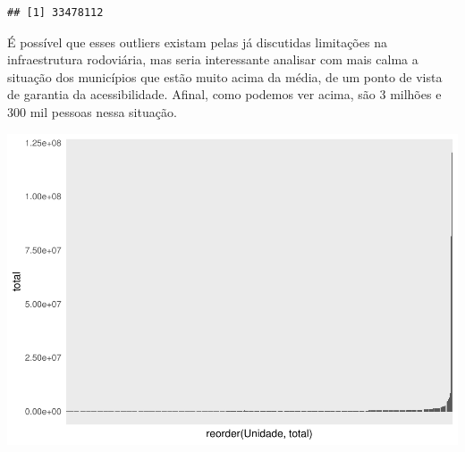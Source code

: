 \documentclass[]{article}
\newenvironment{Shaded}{\begin{snugshade}}{\end{snugshade}}
\newcommand{\DataTypeTok}[1]{\textcolor[rgb]{0.13,0.29,0.53}{#1}}
\newcommand{\DecValTok}[1]{\textcolor[rgb]{0.00,0.00,0.81}{#1}}
\newcommand{\KeywordTok}[1]{\textcolor[rgb]{0.13,0.29,0.53}{\textbf{#1}}}
\newcommand{\NormalTok}[1]{#1}
\newcommand{\OperatorTok}[1]{\textcolor[rgb]{0.81,0.36,0.00}{\textbf{#1}}}
\newcommand{\StringTok}[1]{\textcolor[rgb]{0.31,0.60,0.02}{#1}}
\begin{document}
\begin{verbatim}
## [1] 33478112
\end{verbatim}

É possível que esses outliers existam pelas já discutidas limitações na
infraestrutura rodoviária, mas seria interessante analisar com mais
calma a situação dos municípios que estão muito acima da média, de um
ponto de vista de garantia da acessibilidade. Afinal, como podemos ver
acima, são 3 milhões e 300 mil pessoas nessa situação.

\begin{Shaded}
\end{Shaded}

\includegraphics{trabalho_de_conclusao_files/figure-latex/unnamed-chunk-10-1.pdf}
\end{document}
